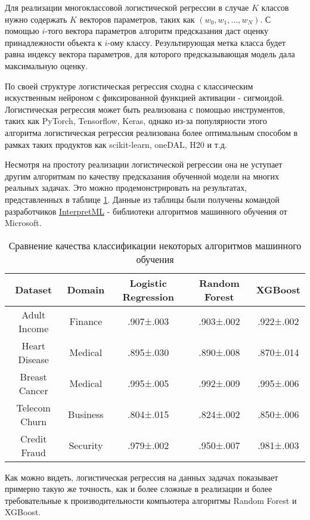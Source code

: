 Для реализации многоклассовой логистической регрессии в случае $K$ классов нужно содержать $K$ векторов параметров, таких как $(w_0,w_1, \ldots, w_N)$. С помощью $i$-того вектора параметров алгоритм предсказания даст оценку принадлежности объекта к $i$-ому классу. Результирующая метка класса будет равна индексу вектора параметров, для которого предсказывающая модель дала максимальную оценку.

По своей структуре логистическая регрессия сходна с классическим искуственным нейроном с фиксированной функцией активации - сигмоидой. Логистическая регрессия может быть реализована с помощью инструментов, таких как PyTorch, Tensorflow, Keras, однако из-за популярности этого алгоритма логистическая регрессия реализована более оптимальным способом в рамках таких продуктов как scikit-learn, oneDAL, H20 и т.д.

Несмотря на простоту реализации логистической регрессии она не уступает другим алгоритмам по качеству предсказания обученной модели на многих реальных задачах. Это можно продемонстрировать на результатах, представленных в таблице \ref{ml_algs_accuracy}. Данные из таблицы были получены командой разработчиков \href{https://github.com/interpretml/interpret}{InterpretML} - библиотеки алгоритмов машинного обучения от Microsoft.

\begin{table}[h!]
\begin{center}
\caption{Сравнение качества классификации некоторых алгоритмов машинного обучения}
\label{ml_algs_accuracy}
\begin{tabular}{c|c|c|c|c}
Dataset & Domain & Logistic Regression & Random Forest & XGBoost\\
\hline
Adult Income & Finance & .907±.003 & .903±.002 & .922±.002\\
Heart Disease & Medical & .895±.030 & .890±.008 & .870±.014\\
Breast Cancer & Medical & .995±.005 & .992±.009 & .995±.006\\
Telecom Churn & Business & .804±.015 & .824±.002 & .850±.006\\
Credit Fraud & Security & .979±.002 & .950±.007 & .981±.003\\
\end{tabular}
\end{center}
\end{table}

Как можно видеть, логистическая регрессия на данных задачах показывает примерно такую же точность, как и более сложные в реализации и более требовательные к производительности компьютера алгоритмы Random Forest и XGBoost.

